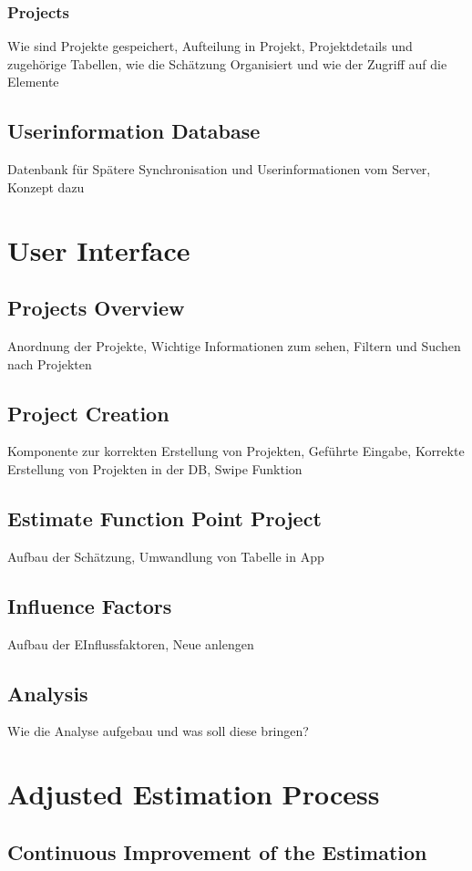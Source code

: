\subsubsection{Projects}

Wie sind Projekte gespeichert, Aufteilung in Projekt, Projektdetails und zugehörige Tabellen, wie die Schätzung Organisiert und wie der Zugriff auf die Elemente

\subsection{Userinformation Database}

Datenbank für Spätere Synchronisation und Userinformationen vom Server, Konzept dazu

\section{User Interface}

\subsection{Projects Overview}

Anordnung der Projekte, Wichtige Informationen zum sehen, Filtern und Suchen nach Projekten

\subsection{Project Creation}

Komponente zur korrekten Erstellung von Projekten, Geführte Eingabe, Korrekte Erstellung von Projekten in der DB, Swipe Funktion

\subsection{Estimate Function Point Project}

Aufbau der Schätzung, Umwandlung von Tabelle in App

\subsection{Influence Factors}

Aufbau der EInflussfaktoren, Neue anlengen

\subsection{Analysis}

Wie die Analyse aufgebau und was soll diese bringen?

\section{Adjusted Estimation Process}\label{adjustedEstimationProcess}


\subsection{Continuous Improvement of the Estimation}

